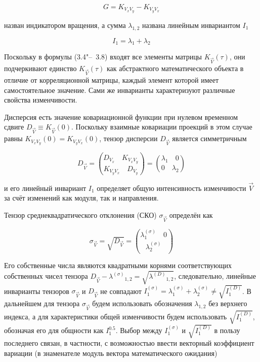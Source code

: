 \begin{equation}
\label{eq:equation3_7}
G=K_{{V_{x}V_{y}}}-K_{{V_{y}V_{x}}}
\end{equation} 

назван индикатором вращения, а сумма $\lambda_{1,2}$ названа линейным инвариантом $I_1$ 

\begin{equation}
\label{eq:equation3_8}
I_1=\lambda_{1}+\lambda_{2}
\end{equation}

Поскольку в формулы (3.4"--~3.8) входят все элементы матрицы $K_{\vec{V}}(\tau)$, они подчеркивают единство $K_{\vec{V}}(\tau)$ как абстрактного математического объекта в отличие от корреляционной матрицы, каждый элемент которой имеет самостоятельное значение. Сами же инварианты характеризуют различные свойства изменчивости.

Дисперсия есть значение ковариационной функции при нулевом временном сдвиге $D_{\vec{V}}\equiv{K_{\vec{V}}(0)}$. Поскольку взаимные ковариации проекций в этом случае равны ${K_{{V_{x}V_{y}}}(0)={K_{{V_{y}V_{x}}}(0)}}$, тензор дисперсии $D_{\vec{V}}$ является симметричным
		
\begin{equation}
\label{eq:equation3_9}
D_{\vec{V}} = {{{D_{V_{x}}\quad K_{V_{x}V_{y}}}\choose {K_{V_{y}V_{x}}\quad D_{V_{y}}}} = {{\lambda_1}\quad 0 \choose 0 \quad {\lambda_2}}}
\end{equation}	
		
и его линейный инвариант $I_1$ определяет общую интенсивность изменчивости $\vec{V}$ за счёт изменений как модуля, так и направления. 

Тензор среднеквадратического отклонения (СКО) $\sigma_{\vec{V}}$ определён как 
		
\begin{equation}
\label{eq:equation3_10}
\sigma_{\vec{V}} = \sqrt{D_{\vec{V}}} = {{\lambda^{(\sigma)}_1 \quad 0}\choose {\lambda^{(\sigma)}_2}}
\end{equation}
		
Его собственные числа являются квадратными корнями соответствующих собственных чисел тензора $D_{\vec{V}}-{{\lambda^{(\sigma)}}_{1,2}}={\sqrt{{\lambda^{(D)}}_{1,2}}}$, следовательно, линейные инварианты тензоров $\sigma_{\vec{V}}$ и $D_{\vec{V}}$ не совпадают ${I^{(\sigma)}_1}={{\lambda^{(\sigma)}_1}+{\lambda^{(\sigma)}_2}\neq{\sqrt{I^{(D)}_1}}}$. В дальнейшем для тензора $\sigma_{\vec{V}}$ будем использовать обозначения $\lambda_{1,2}$ без верхнего индекса, а для характеристики общей изменчивости будем использовать $\sqrt{I^{(D)}_1}$, обозначая его для общности как $I^{0.5}_1$. Выбор между $I^{(\sigma)}_1$ и $\sqrt{I^{(D)}_1}$ в пользу последнего связан, в частности, с возможностью ввести векторный коэффициент вариации (в знаменателе модуль вектора математического ожидания)
		
